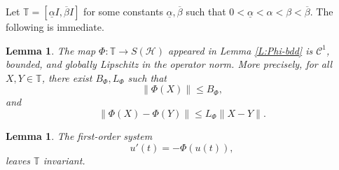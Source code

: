 \documentclass[12pt,reqno]{amsart}
\newtheorem{lemma}[theorem]{Lemma}
\begin{document}
Let $\mathbb{T} = [\underline{\alpha} I, \overline{\beta} I]$ for some constants $\underline{\alpha}, \overline{\beta}$ such that $0 < \underline{\alpha} < \alpha < \beta < \overline{\beta}$. The following is immediate.

\begin{lemma} \label{L:Phi-specific-bounds}
The map \(\Phi: \mathbb{T} \to S(\mathcal H)\) appeared in Lemma \ref{L:Phi-bdd} is \( \mathcal{C}^1 \), bounded, and globally Lipschitz in the operator norm.
More precisely, for all \( X,Y \in \mathbb{T} \), there exist $B_{\Phi}, L_{\Phi}$ such that
\[
\| \Phi(X) \| \le B_{\Phi},
\]
and
\[
\| \Phi(X) - \Phi(Y) \| \le L_{\Phi} \| X - Y \|.
\]
\end{lemma}


\begin{lemma} \label{L:flow-invariance-S1}
The first-order system
\[
u'(t) = -\Phi(u(t)),
\]
leaves \( \mathbb{T} \) invariant.
\end{lemma}
\end{document}
